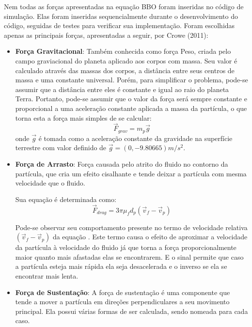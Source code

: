 Nem todas as forças apresentadas na equação BBO foram inseridas no código de simulação.
Elas foram inseridas sequencialmente durante o desenvolvimento do código, seguidas de testes para verificar sua implementação.
Foram escolhidas apenas as principais forças, apresentadas a seguir, por Crowe (2011)\cite{crowe}: 
\begin{itemize}
    \item \textbf{Força Gravitacional}:
        Também conhecida como força Peso, criada pelo campo graviacional do planeta aplicado aos corpos com massa.
        Seu valor é calculado através das massas dos corpos, a distância entre seus centros de massa e uma constante universal.
        Porém, para simplificar o problema, pode-se assumir que a distância entre eles é constante e igual ao raio do planeta Terra.
        Portanto, pode-se assumir que o valor da força será sempre constante e proporcional a uma aceleração constante aplicada a massa da partícula, o que torna esta a força mais simples de se calcular:
        \begin{equation}
            \vec{F}_{grav} = m_p \vec{g}
            \label{grav}
        \end{equation}
        onde $\vec{g}$ é tomada como a aceleração constante da gravidade na superfície terrestre com valor definido de $\vec{g} = (0, -9.80665)m/s^2$.

    \item \textbf{Força de Arrasto}:
        Força causada pelo atrito do fluido no contorno da partícula, que cria um efeito cisalhante e tende deixar a partícula com mesma velocidade que o fluido.

        Sua equação é determinada como:
        \begin{equation}
            \vec{F}_{drag} = 3 \pi \mu_f d_p \left(\vec{v}_{f} - \vec{v}_{p} \right)
            \label{drag}
        \end{equation}

        Pode-se observar seu comportamento presente no termo de velocidade relativa $\left(\vec{v}_{f} - \vec{v}_{p} \right)$ da equação .
        Este termo causa o efeito de aproximar a velocidade da partícula à velocidade do fluido já que torna a força proporcionalmente maior quanto mais afastadas elas se encontrarem.
        E o sinal permite que caso a partícula esteja mais rápida ela seja desacelerada e o inverso se ela se encontrar mais lenta. 

    \item \textbf{Força de Sustentação}:
        A força de sustentação é uma componente que tende a mover a partícula em direções perpendiculares a seu movimento principal.
        Ela possui várias formas de ser calculada, sendo nomeada para cada caso.


\end{itemize}
